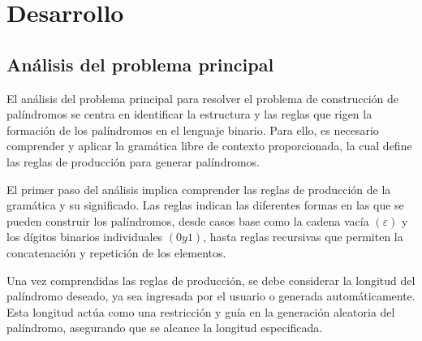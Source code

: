 \chapter{Desarrollo}
\section{Análisis del problema principal}



El análisis del problema principal para resolver el problema de construcción de palíndromos se centra en identificar la estructura y las reglas que rigen la formación de los palíndromos en el lenguaje binario. Para ello, es necesario comprender y aplicar la gramática libre de contexto proporcionada, la cual define las reglas de producción para generar palíndromos.\newline

El primer paso del análisis implica comprender las reglas de producción de la gramática y su significado. Las reglas indican las diferentes formas en las que se pueden construir los palíndromos, desde casos base como la cadena vacía $(ε)$ y los dígitos binarios individuales $(0 y 1)$, hasta reglas recursivas que permiten la concatenación y repetición de los elementos.\newline

Una vez comprendidas las reglas de producción, se debe considerar la longitud del palíndromo deseado, ya sea ingresada por el usuario o generada automáticamente. Esta longitud actúa como una restricción y guía en la generación aleatoria del palíndromo, asegurando que se alcance la longitud especificada.\newline

